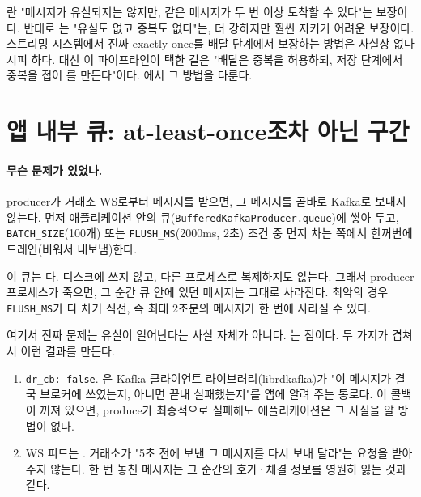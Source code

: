 란 "메시지가 유실되지는 않지만, 같은 메시지가
두 번 이상 도착할 수 있다"는 보장이다. 반대로 는
"유실도 없고 중복도 없다"는, 더 강하지만 훨씬 지키기 어려운 보장이다. 스트리밍
시스템에서 진짜 exactly-once를 배달 단계에서 보장하는 방법은 사실상 없다시피 하다.
대신 이 파이프라인이 택한 길은 "배달은 중복을 허용하되, 저장 단계에서 중복을
접어 를 만든다"이다.
에서 그 방법을 다룬다.

\section{앱 내부 큐: at-least-once조차 아닌 구간}
\label{sec:delivery-leak}

\paragraph{무슨 문제가 있었나.}
producer가 거래소 WS로부터 메시지를 받으면, 그 메시지를 곧바로 Kafka로 보내지 않는다.
먼저 애플리케이션 안의 큐(\texttt{BufferedKafkaProducer.queue})에 쌓아 두고,
\texttt{BATCH\_SIZE}(100개) 또는 \texttt{FLUSH\_MS}(2000ms, 2초) 조건 중 먼저 차는
쪽에서 한꺼번에 드레인(비워서 내보냄)한다.

이 큐는 다. 디스크에 쓰지 않고, 다른 프로세스로 복제하지도
않는다. 그래서 producer 프로세스가 죽으면, 그 순간 큐 안에 있던 메시지는 그대로
사라진다. 최악의 경우 \texttt{FLUSH\_MS}가 다 차기 직전, 즉 최대 2초분의 메시지가
한 번에 사라질 수 있다.

\begin{callout}
여기서 진짜 문제는 유실이 일어난다는 사실 자체가 아니다. 는 점이다. 두 가지가 겹쳐서 이런 결과를 만든다.

\begin{enumerate}
  \item \texttt{dr\_cb: false}. 은 Kafka 클라이언트
    라이브러리(librdkafka)가 "이 메시지가 결국 브로커에 쓰였는지, 아니면 끝내
    실패했는지"를 앱에 알려 주는 통로다. 이 콜백이 꺼져 있으면, produce가 최종적으로
    실패해도 애플리케이션은 그 사실을 알 방법이 없다.
  \item WS 피드는 . 거래소가 "5초 전에 보낸 그 메시지를
    다시 보내 달라"는 요청을 받아 주지 않는다. 한 번 놓친 메시지는 그 순간의 호가·체결
    정보를 영원히 잃는 것과 같다.
\end{enumerate}
\end{callout}

